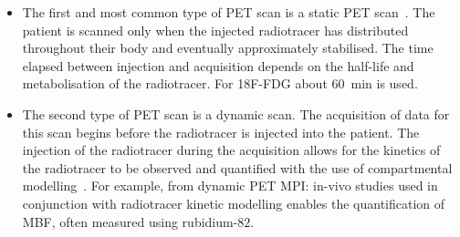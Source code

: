                 \begin{itemize}
                    \item The first and most common type of \gls{PET} scan is a static \gls{PET} scan~\parencite{Muzi2012QuantitativeImaging}. The patient is scanned only when the injected radiotracer has distributed throughout their body and eventually approximately stabilised. %
                    The time elapsed between injection and acquisition depends on the half-life and metabolisation of the radiotracer. For \gls{18F-FDG} about \SI{60}{\minute} is used.
                    
                    \item The second type of \gls{PET} scan is a dynamic scan. The acquisition of data for this scan begins before the radiotracer is injected into the patient. The injection of the radiotracer during the acquisition allows for the kinetics of the radiotracer to be observed and quantified with the use of compartmental modelling~\parencite{DynamicPETImagingLammertsma}. For example, from dynamic \gls{PET} \gls{MPI}: %
                    in-vivo studies used in conjunction with radiotracer kinetic modelling enables the quantification of \gls{MBF}, often measured using rubidium-$82$. %
                \end{itemize}
            
